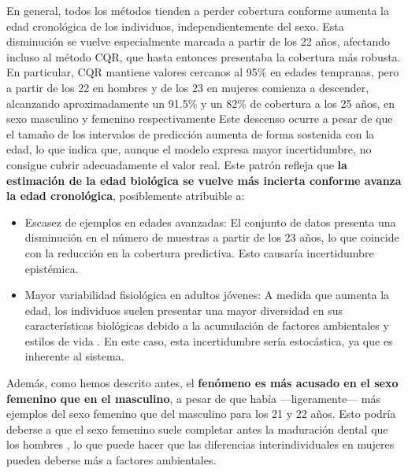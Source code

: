 En general, todos los métodos tienden a perder cobertura conforme aumenta la edad cronológica de los individuos, independientemente del sexo. Esta disminución se vuelve especialmente marcada a partir de los 22 años, afectando incluso al método \acrshort{CQR}, que hasta entonces presentaba la cobertura más robusta. En particular, \acrshort{CQR} mantiene valores cercanos al 95\% en edades tempranas, pero a partir de los 22 en hombres y de los 23 en mujeres comienza a descender, alcanzando aproximadamente un 91.5\% y un 82\% de cobertura a los 25 años, en sexo masculino y femenino respectivamente Este descenso ocurre a pesar de que el tamaño de los intervalos de predicción aumenta de forma sostenida con la edad, lo que indica que, aunque el modelo expresa mayor incertidumbre, no consigue cubrir adecuadamente el valor real. Este patrón refleja que \textbf{la estimación de la edad biológica se vuelve más incierta conforme avanza la edad cronológica}, posiblemente atribuible a:

\begin{itemize}

    \item Escasez de ejemplos en edades avanzadas: El conjunto de datos presenta una disminución en el número de muestras a partir de los 23 años, lo que coincide con la reducción en la cobertura predictiva. Esto causaría incertidumbre epistémica.
    
    \item Mayor variabilidad fisiológica en adultos jóvenes: A medida que aumenta la edad, los individuos suelen presentar una mayor diversidad en sus características biológicas debido a la acumulación de factores ambientales y estilos de vida \cite{ubelaker2018, scheuer2004}. En este caso, esta incertidumbre sería estocástica, ya que es inherente al sistema. 

\end{itemize}

Además, como hemos descrito antes, el \textbf{fenómeno es más acusado en el sexo femenino que en el masculino}, a pesar de que había ---ligeramente--- más ejemplos del sexo femenino que del masculino para los 21 y 22 años. Esto podría deberse a que el sexo femenino suele completar antes la maduración dental que los hombres \cite{scheuer2004}, lo que puede hacer que las diferencias interindividuales en mujeres pueden deberse más a factores ambientales.

